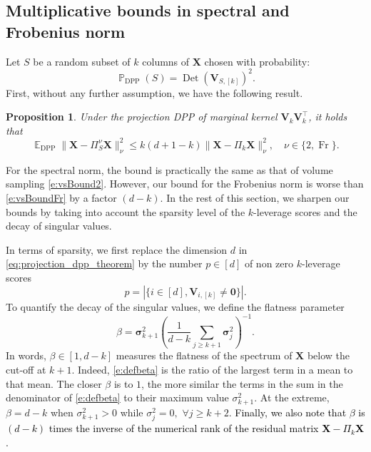 \documentclass[twoside,11pt]{book}
\newcommand{\rev}[1]{\textcolor{black}{#1}}
\newtheorem{proposition}{Proposition}
\numberwithin{theorem}{chapter}
\numberwithin{definition}{chapter}
\numberwithin{proposition}{chapter}
\numberwithin{corollary}{chapter}
\numberwithin{example}{chapter}
\numberwithin{lemma}{chapter}
\numberwithin{assumption}{chapter}
\numberwithin{equation}{chapter}
\numberwithin{figure}{chapter}
\DeclareMathOperator{\Det}{Det}
\DeclareMathOperator{\Fr}{\mathrm{Fr}}
\DeclareMathOperator{\DPP}{\mathrm{DPP}}
\DeclareMathOperator{\Tran}{\intercal}
\DeclareMathOperator{\EX}{\mathbb{E}}
\DeclareMathOperator{\Prb}{\mathbb{P}}
\begin{document}
\subsection{Multiplicative bounds in spectral and Frobenius norm}
\label{sec:new_results_randomized}
Let $S$ be a random subset of $k$ columns of $\bm{X}$ chosen with probability:
\begin{equation}
	\Prb_{\DPP}(S) = \Det(\bm{V}_{S,[k]})^{2}.
\end{equation}
First, without any further assumption, we have the following result.
\begin{proposition}
    \label{projection_dpp_theorem}
    Under the projection DPP of marginal kernel $\bm{V}^{}_{k}\bm{V}^{\Tran}_{k}$, it holds that
    \begin{equation}
    	\label{eq:projection_dpp_theorem}
    	\EX_{\DPP} \| \bm{X} - \Pi_{S}^{\nu}\bm{X} \|_{\nu}^{2} \leq k(d+1-k)\| \bm{X} - \Pi_{k}\bm{X} \|_{\nu}^{2}, \quad \nu\in\{2,\Fr\}.
    \end{equation}
\end{proposition}
For the spectral norm, the bound is practically the same as that of volume sampling \eqref{e:vsBound2}. However, our bound for the Frobenius norm is worse than \eqref{e:vsBoundFr} by a factor $(d-k)$. In the rest of this section, we sharpen our bounds by taking into account the sparsity level of the $k$-leverage scores and the decay of singular values.

In terms of sparsity, we first replace the dimension $d$ in \eqref{eq:projection_dpp_theorem} by the number $p\in[d]$ of non zero $k$-leverage scores
\begin{equation}
  p = \left| \{i \in [d], \bm{V}_{i,[k]} \neq \bm{0}\}\right|.
  \label{e:defp}
\end{equation}
To quantify the decay of the singular values, we define the flatness parameter
\begin{equation}
  \beta = \bm{\sigma}_{k+1}^{2} \left(\frac{1}{d-k} \sum\limits_{j \geq k+1} \bm{\sigma}_{j}^{2}\right)^{-1}.
  \label{e:defbeta}
\end{equation}
In words, $\beta\in[1,d-k]$ measures the flatness of the spectrum of $\bm{X}$ below the cut-off at $k+1$. Indeed, \eqref{e:defbeta} is the ratio of the largest term in a mean to that mean. The closer $\beta$ is to $1$, the more similar the terms in the sum in the denominator of \eqref{e:defbeta} to their maximum value $\sigma_{k+1}^{2}$. At the extreme, $\beta=d-k$ when $\sigma^2_{k+1}>0$ while $\sigma_j^2=0,$ $\forall j\geq k+2$. \rev{Finally, we also note that $\beta$ is $(d-k)$ times the inverse of the numerical rank \citep{RuVe07} of the residual matrix $\bm{X}-\Pi_{k}\bm{X}$.}
\end{document}
